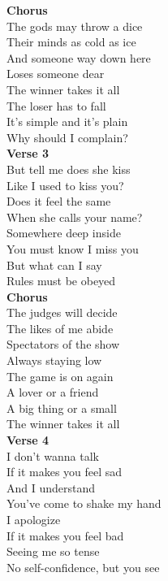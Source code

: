 \documentclass[a4paper]{article}
\begin{document}
{\begin{multicols}
{            }
            \textbf{Chorus}
            ~\\
            {
                \cutive
                \obeyspaces
The gods may throw a dice
\\
Their minds as cold as ice
\\
And someone way down here
\\
Loses someone dear
\\
The winner takes it all
\\
The loser has to fall
\\
It's simple and it's plain
\\
Why should I complain?
\\

            }
            \textbf{Verse 3}
            ~\\
            {
                \cutive
                \obeyspaces
But tell me does she kiss
\\
Like I used to kiss you?
\\
Does it feel the same
\\
When she calls your name? 
\\
Somewhere deep inside
\\
You must know I miss you
\\
But what can I say
\\
Rules must be obeyed
\\

            }
            \textbf{Chorus}
            ~\\
            {
                \cutive
                \obeyspaces
The judges will decide
\\
The likes of me abide
\\
Spectators of the show
\\
Always staying low
\\
The game is on again
\\
A lover or a friend
\\
A big thing or a small
\\
The winner takes it all
\\

            }
            \columnbreak
            \textbf{Verse 4}
            ~\\
            {
                \cutive
                \obeyspaces
I don't wanna talk
\\
If it makes you feel sad
\\
And I understand
\\
You've come to shake my hand
\\
I apologize
\\
If it makes you feel bad
\\
Seeing me so tense
\\
No self-confidence, but you see 
\\

}
\end{multicols}}
\end{document}
